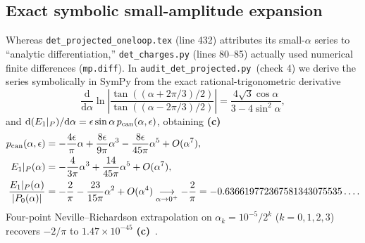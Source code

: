 \documentclass[11pt,a4paper]{article}
\newcommand{\Lc}{\textsf{\textbf{(c)}}\ }
\newcommand{\scr}{\texttt{audit\_\allowbreak det\_\allowbreak projected.py}}
\newcommand{\dd}{\mathrm d}
\begin{document}
\subsection{Exact symbolic small-amplitude expansion}
Whereas \texttt{det\_projected\_oneloop.tex} (line 432) attributes its small-$\alpha$
series to ``analytic differentiation,'' \texttt{det\_charges.py} (lines 80--85)
actually used numerical finite differences (\texttt{mp.diff}). In \scr\ (check 4)
we derive the series symbolically in SymPy from the exact rational-trigonometric
derivative
\begin{equation}\label{eq:dlog_exact}
 \frac{\dd}{\dd\alpha}\ln\left|\frac{\tan((\alpha+2\pi/3)/2)}{\tan((\alpha-2\pi/3)/2)}\right|
 = \frac{4\sqrt3\cos\alpha}{3-4\sin^2\alpha},
\end{equation}
and $\dd(E_1|_P)/\dd\alpha=\epsilon\sin\alpha\,p_{\rm can}(\alpha,\epsilon)$,
obtaining \Lc
\begin{align}
 p_{\rm can}(\alpha,\epsilon) &= -\frac{4\epsilon}{\pi}\alpha+\frac{8\epsilon}{9\pi}\alpha^3-\frac{8\epsilon}{45\pi}\alpha^5+O(\alpha^7),\\
 E_1|_P(\alpha) &= -\frac{4}{3\pi}\alpha^3+\frac{14}{45\pi}\alpha^5+O(\alpha^7),\\
 \frac{E_1|_P(\alpha)}{|P_0(\alpha)|} &= -\frac{2}{\pi}-\frac{23}{15\pi}\alpha^2+O(\alpha^4)
 \underset{\alpha\to0^+}{\longrightarrow} -\frac2\pi = -0.636619772367581343075535\ldots .
\end{align}
Four-point Neville--Richardson extrapolation on $\alpha_k=10^{-5}/2^k$ ($k=0,1,2,3$)
recovers $-2/\pi$ to $1.47\times10^{-45}$ \Lc.
\end{document}
